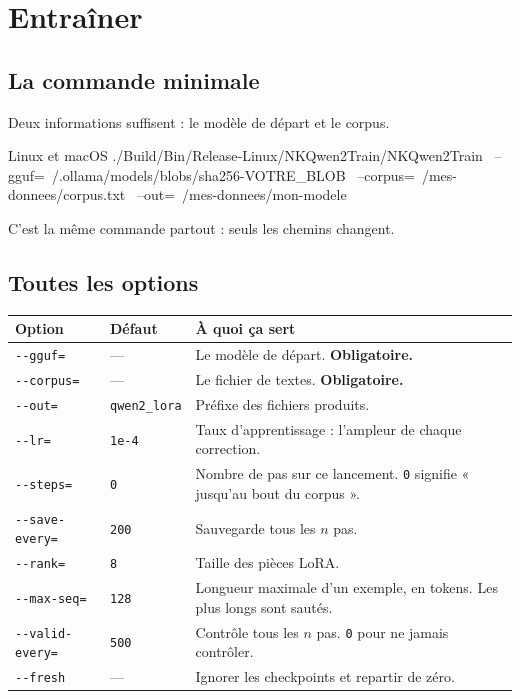 \chapter{Entraîner}

\section{La commande minimale}

Deux informations suffisent : le modèle de départ et le corpus.


\begin{nkcode}[]{Linux et macOS}
./Build/Bin/Release-Linux/NKQwen2Train/NKQwen2Train \
  --gguf=~/.ollama/models/blobs/sha256-VOTRE_BLOB \
  --corpus=~/mes-donnees/corpus.txt \
  --out=~/mes-donnees/mon-modele
\end{nkcode}

C'est la même commande partout : seuls les chemins changent.

\section{Toutes les options}

\begin{center}
\begin{longtable}{p{3.9cm}p{2.0cm}p{7.6cm}}
\toprule
\textbf{Option} & \textbf{Défaut} & \textbf{À quoi ça sert} \\
\midrule
\endhead
\texttt{-{}-gguf=} & — & Le modèle de départ. \textbf{Obligatoire.} \\
\texttt{-{}-corpus=} & — & Le fichier de textes. \textbf{Obligatoire.} \\
\texttt{-{}-out=} & \texttt{qwen2\_lora} & Préfixe des fichiers produits. \\
\texttt{-{}-lr=} & \texttt{1e-4} & Taux d'apprentissage : l'ampleur de chaque
   correction. \\
\texttt{-{}-steps=} & \texttt{0} & Nombre de pas sur ce lancement. \texttt{0}
   signifie « jusqu'au bout du corpus ». \\
\texttt{-{}-save-every=} & \texttt{200} & Sauvegarde tous les $n$ pas. \\
\texttt{-{}-rank=} & \texttt{8} & Taille des pièces LoRA. \\
\texttt{-{}-max-seq=} & \texttt{128} & Longueur maximale d'un exemple, en
   tokens. Les plus longs sont sautés. \\
\texttt{-{}-valid-every=} & \texttt{500} & Contrôle tous les $n$ pas.
   \texttt{0} pour ne jamais contrôler. \\
\texttt{-{}-fresh} & — & Ignorer les checkpoints et repartir de zéro. \\
\bottomrule
\end{longtable}
\end{center}

